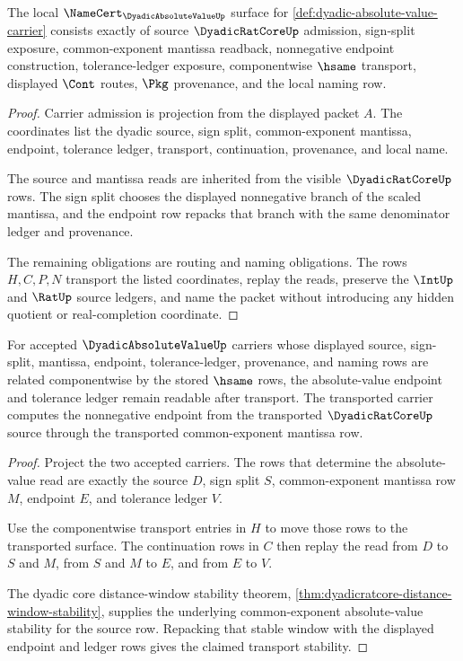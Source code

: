 \begin{theorem}
\label{thm:dyadic-absolute-value-namecert-obligations}
The local $\NameCert_{\DyadicAbsoluteValueUp}$ surface for \autoref{def:dyadic-absolute-value-carrier} consists exactly of source $\DyadicRatCoreUp$ admission, sign-split exposure, common-exponent mantissa readback, nonnegative endpoint construction, tolerance-ledger exposure, componentwise $\hsame$ transport, displayed $\Cont$ routes, $\Pkg$ provenance, and the local naming row.
\end{theorem}
\begin{proof}
Carrier admission is projection from the displayed packet $A$. The coordinates list the dyadic source, sign split, common-exponent mantissa, endpoint, tolerance ledger, transport, continuation, provenance, and local name.

The source and mantissa reads are inherited from the visible $\DyadicRatCoreUp$ rows. The sign split chooses the displayed nonnegative branch of the scaled mantissa, and the endpoint row repacks that branch with the same denominator ledger and provenance.

The remaining obligations are routing and naming obligations. The rows $H,C,P,N$ transport the listed coordinates, replay the reads, preserve the $\IntUp$ and $\RatUp$ source ledgers, and name the packet without introducing any hidden quotient or real-completion coordinate.
\end{proof}

\begin{theorem}
\label{thm:dyadic-absolute-value-transport-stability}
For accepted $\DyadicAbsoluteValueUp$ carriers whose displayed source, sign-split, mantissa, endpoint, tolerance-ledger, provenance, and naming rows are related componentwise by the stored $\hsame$ rows, the absolute-value endpoint and tolerance ledger remain readable after transport. The transported carrier computes the nonnegative endpoint from the transported $\DyadicRatCoreUp$ source through the transported common-exponent mantissa row.
\end{theorem}
\begin{proof}
Project the two accepted carriers. The rows that determine the absolute-value read are exactly the source $D$, sign split $S$, common-exponent mantissa row $M$, endpoint $E$, and tolerance ledger $V$.

Use the componentwise transport entries in $H$ to move those rows to the transported surface. The continuation rows in $C$ then replay the read from $D$ to $S$ and $M$, from $S$ and $M$ to $E$, and from $E$ to $V$.

The dyadic core distance-window stability theorem, \autoref{thm:dyadicratcore-distance-window-stability}, supplies the underlying common-exponent absolute-value stability for the source row. Repacking that stable window with the displayed endpoint and ledger rows gives the claimed transport stability.
\end{proof}

